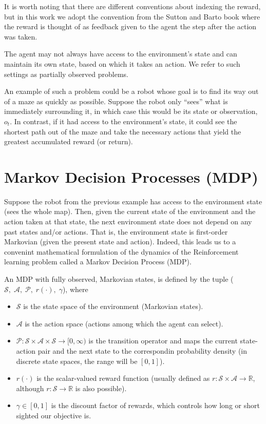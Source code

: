 \documentclass{report}
\newcommand{\reals}{\mbox{\(\mathbb R\)}}
\numberwithin{equation}{section}
\numberwithin{figure}{section}
\numberwithin{table}{section}
\begin{document}
It is worth noting that there are 
different conventions about indexing the reward, but in this work 
we adopt the convention from the Sutton and Barto book 
\citep{Sutton1998} where the reward is thought of as feedback 
given to the agent the step after the action was taken.

The agent may not always have access 
to the environment's state and can maintain its own state, based 
on which it takes an action. We refer to such settings as partially 
observed problems. 

An example of such a problem could be a robot 
whose goal is to find its way out of a maze as quickly as possible.
Suppose the robot only ``sees'' what is 
immediately surrounding it, in which case this would be its state 
or observation, $o_t$. 
In contrast, if it had access to the environment's state, it could 
see the shortest path out of the maze and take the necessary actions 
that yield the greatest accumulated reward (or return).

\section{Markov Decision Processes (MDP)}
\label{sec:RLMDP}
Suppose the robot from the previous example has access to the 
environment state (sees the whole map). Then, given the 
current state of the environment 
and the action taken 
at that state, the next environment state does not depend on any 
past states and/or actions. That is, the 
environment state is first-order Markovian 
(given the present state and action). Indeed, this 
leads us to a convenint 
mathematical formulation of the dynamics of the 
Reinforcement learning problem called 
a Markov Decision Process (MDP).

An MDP with fully observed, Markovian states, is defined by the tuple 
($\mathcal{S},\; \mathcal{A},\; \mathcal{P},\; r(\cdot),\; \gamma$), where
\begin{itemize}
  \item $\mathcal{S}$ is the state space of the environment 
    (Markovian states).
  \item $\mathcal{A}$ is the action space (actions among which 
    the agent can select).
  \item $\mathcal{P}:\mathcal{S}\times \mathcal{A}\times \mathcal{S}\rightarrow [0, \infty)$ 
    is the transition operator and maps 
    the current state-action pair and the next state to the 
    correspondin probability density (in discrete state spaces, 
    the range will be $[0, 1]$).
  \item $r(\cdot)$ is the scalar-valued reward function 
    (usually defined as $r:\mathcal{S}\times \mathcal{A}\rightarrow \reals$, 
    although $r:\mathcal{S}\rightarrow \reals$ is also possible).
  \item $\gamma\in [0, 1]$ is the discount factor of rewards, which controls 
    how long or short sighted our objective is.
\end{itemize} 
\end{document}
